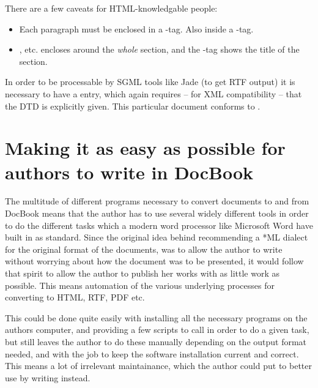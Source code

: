 There are a few caveats for HTML-knowledgable people:

\begin{itemize}
\item Each paragraph must be enclosed in a -tag.  Also
  inside a -tag.
\item {},  etc. encloses around the \textit{whole} section, and the
  -tag shows the title of the section.
\end{itemize}  
In order to be processable by SGML tools like Jade (to get RTF output)
it is necessary to have a  entry, which again requires
-- for XML compatibility -- that the DTD is explicitly given.  This
particular document conforms to
.





\section{Making it as easy as possible for authors to write in DocBook}
\label{sec:making-it-as-easy-as-possible-for-authors-to-write-in-docbook}

The multitude of different programs necessary to convert documents to
and from DocBook means that the author has to use several widely
different tools in order to do the different tasks which a modern word
processor like Microsoft Word have built in as standard.  Since the
original idea behind recommending a *ML dialect for the original
format of the documents, was to allow the author to write without
worrying about how the document was to be presented, it would follow
that spirit to allow the author to publish her works with as little
work as possible.  This means automation of the various underlying
processes for converting to HTML, RTF, PDF etc.

This could be done quite easily with installing all the necessary
programs on the authors computer, and providing a few scripts to call
in order to do a given task, but still leaves the author to do these
manually depending on the output format needed, and with the job to
keep the software installation current and correct.   This means a lot
of irrelevant maintainance, which the author could put to better use
by writing instead.  


